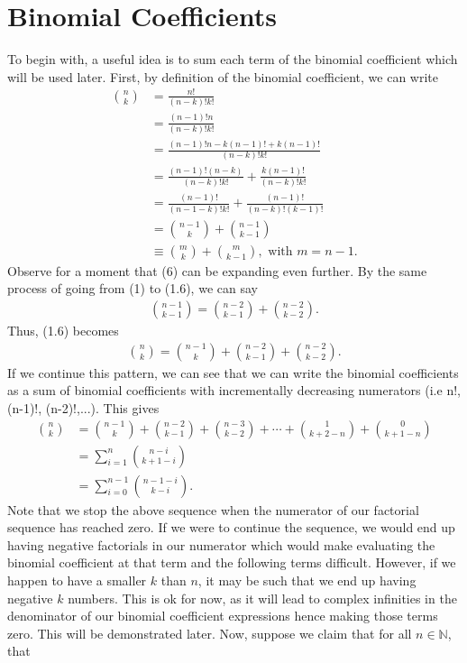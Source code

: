 \section{Binomial Coefficients}

To begin with, a useful idea is to sum each term of the binomial coefficient which will be used later. First, by definition of the binomial coefficient, we can write
\begin{align}
	{{n}\choose{k}}&=\frac{n!}{(n-k)!k!}\\
	&=\frac{(n-1)!n}{(n-k)!k!}\\&
	=\frac{(n-1)!n-k(n-1)!+k(n-1)!}{(n-k)!k!}\\
	&=\frac{(n-1)!(n-k)}{(n-k)!k!}+\frac{k(n-1)!}{(n-k)!k!}\\
	&=\frac{(n-1)!}{(n-1-k)!k!}+\frac{(n-1)!}{(n-k)!(k-1)!}\\&={{n-1}\choose{k}}+{{n-1}\choose{k-1}}\\
	&\equiv {{m}\choose{k}}+{{m}\choose{k-1}}, \textrm{ with }m=n-1.
\end{align} 
Observe for a moment that (6) can be expanding even further. By the same process of going from (1) to (1.6), we can say
\begin{align}
	{{n-1}\choose{k-1}} = {{n-2}\choose{k-1}}+{{n-2}\choose{k-2}}.
\end{align}
Thus, (1.6) becomes
\begin{align}
	{{n}\choose{k}}={{n-1}\choose{k}}+{{n-2}\choose{k-1}}+{{n-2}\choose{k-2}}.
\end{align}
If we continue this pattern, we can see that we can write the binomial coefficients as a sum of binomial coefficients with incrementally decreasing numerators (i.e n!, (n-1)!, (n-2)!,...). This gives
\begin{align}
	{{n}\choose{k}}&={{n-1}\choose{k}}+{{n-2}\choose{k-1}}+{{n-3}\choose{k-2}}+\cdots+{{1}\choose{k+2-n}}+{{0}\choose{k+1-n}} \\
	&=\sum_{i=1}^{n}{{n-i}\choose{k+1-i}} \\
	&=\sum_{i=0}^{n-1}{{n-1-i}\choose{k-i}}.
\end{align}
Note that we stop the above sequence when the numerator of our factorial sequence has reached zero. If we were to continue the sequence, we would end up having negative factorials in our numerator which would make evaluating the binomial coefficient at that term and the following terms difficult. However, if we happen to have a smaller $k$ than $n$, it may be such that we end up having negative $k$ numbers. This is ok for now, as it will lead to complex infinities in the denominator of our binomial coefficient expressions hence making those terms zero. This will be demonstrated later. Now, suppose we claim that for all $n\in \mathbb{N}$, that
